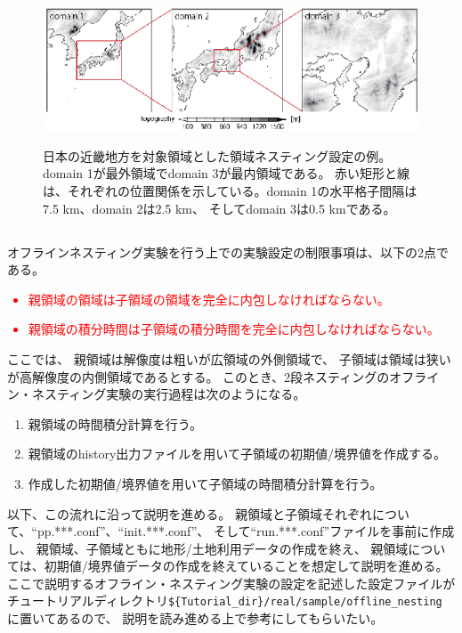 \begin{figure}[t]
\begin{center}
  \includegraphics[width=1.0\hsize]{./figure/nesting_sample.eps}\\
  \caption{日本の近畿地方を対象領域とした領域ネスティング設定の例。 
    domain 1が最外領域でdomain 3が最内領域である。
    赤い矩形と線は、それぞれの位置関係を示している。domain 1の水平格子間隔は7.5 km、domain 2は2.5 km、
    そしてdomain 3は0.5 kmである。}
  \label{fig_nestsample}
\end{center}
\end{figure}


\subsection{\SubsecOflineNesting} \label{subsec:nest_offline}

オフラインネスティング実験を行う上での実験設定の制限事項は、以下の2点である。
\textcolor{red}{
\begin{itemize}
 \item 親領域の領域は子領域の領域を完全に内包しなければならない。
 \item 親領域の積分時間は子領域の積分時間を完全に内包しなければならない。
\end{itemize}
}


ここでは、
親領域は解像度は粗いが広領域の外側領域で、
子領域は領域は狭いが高解像度の内側領域であるとする。
このとき、2段ネスティングのオフライン・ネスティング実験の実行過程は次のようになる。

{\gt
\begin{enumerate}
 \item 親領域の時間積分計算を行う。
 \item 親領域のhistory出力ファイルを用いて子領域の初期値/境界値を作成する。
 \item 作成した初期値/境界値を用いて子領域の時間積分計算を行う。
\end{enumerate}
}

以下、この流れに沿って説明を進める。
親領域と子領域それぞれについて、``pp.***.conf''、``init.***.conf''、
そして``run.***.conf''ファイルを事前に作成し、
親領域、子領域ともに地形/土地利用データの作成を終え、
親領域については、初期値/境界値データの作成を終えていることを想定して説明を進める。
ここで説明するオフライン・ネスティング実験の設定を記述した設定ファイルが
チュートリアルディレクトリ\verb|${Tutorial_dir}/real/sample/offline_nesting|
に置いてあるので、
説明を読み進める上で参考にしてもらいたい。

